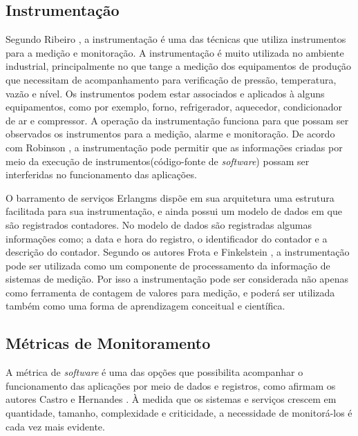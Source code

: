 
\subsection{Instrumentação}
\label{instrumentacao}
Segundo Ribeiro \cite{ribeiro1999instrumentaccao}, a instrumentação é uma das técnicas que utiliza instrumentos para a medição e monitoração. A instrumentação é muito utilizada no ambiente industrial, principalmente no que tange a medição dos equipamentos de produção que necessitam de acompanhamento para verificação de pressão, temperatura, vazão e nível. Os instrumentos podem estar associados e
aplicados à alguns equipamentos, como por exemplo, forno, refrigerador,
aquecedor, condicionador de ar e compressor. A operação da instrumentação funciona para que possam ser observados os instrumentos para a medição, alarme e monitoração. De acordo com Robinson \cite{robinson2002monitoring}, a instrumentação pode permitir que as informações criadas por meio da execução de instrumentos(código-fonte de \textit{software}) possam ser interferidas no funcionamento das aplicações.

O barramento de serviços Erlangms dispõe em sua arquitetura uma estrutura facilitada para sua instrumentação, e ainda possui um modelo de dados em que são registrados contadores. No modelo de dados são registradas algumas informações como; a data e hora do registro, o identificador do contador e a descrição do contador.  
Segundo os autores Frota e Finkelstein \cite{frota2008educaccao}, a instrumentação pode ser utilizada como um componente de processamento da informação de sistemas de medição. Por isso a instrumentação pode ser considerada não apenas como ferramenta de contagem de valores para medição, e poderá ser utilizada também como uma forma de aprendizagem conceitual e científica.  


\subsection{Métricas de Monitoramento}

A métrica de \textit{software} é uma das opções que possibilita acompanhar o funcionamento das aplicações por meio de dados e registros, como afirmam os autores Castro e Hernandes \cite{de2016metrica}. À medida que os sistemas e serviços crescem em quantidade, tamanho, complexidade e criticidade, a necessidade de monitorá-los é cada vez mais evidente. 

